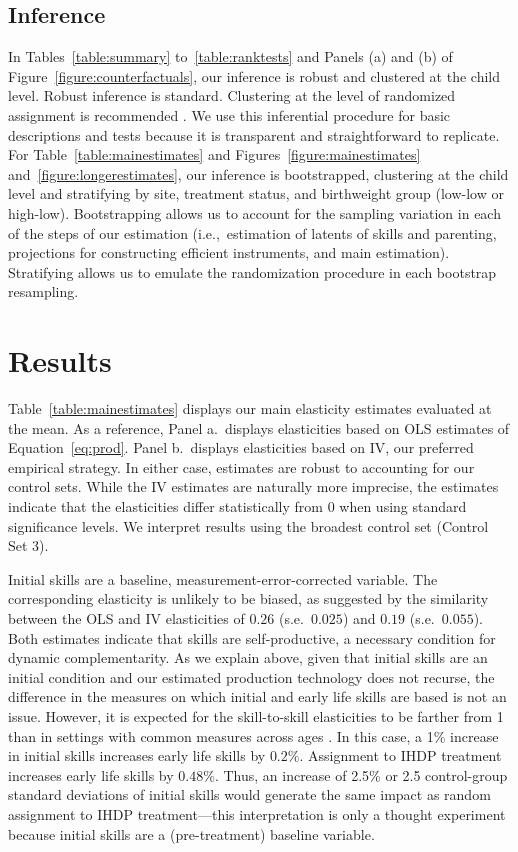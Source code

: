 \subsection{ Inference} In Tables~\ref{table:summary} to~\ref{table:ranktests} and Panels (a) and (b) of Figure~\ref{figure:counterfactuals}, our inference is robust and clustered at the child level. Robust inference is standard. Clustering at the level of randomized assignment is recommended \citep{abadieWhenShouldYou2022}. We use this inferential procedure for basic descriptions and tests because it is transparent and straightforward to replicate. For Table~\ref{table:mainestimates} and Figures~\ref{figure:mainestimates} and~\ref{figure:longerestimates}, our inference is bootstrapped, clustering at the child level and stratifying by site, treatment status, and birthweight group (low-low or high-low). Bootstrapping allows us to account for the sampling variation in each of the steps of our estimation (i.e.,\ estimation of latents of skills and parenting, projections for constructing efficient instruments, and main estimation). Stratifying allows us to emulate the randomization procedure in each bootstrap resampling.

\section{ Results} \label{section:results}

\noindent Table~\ref{table:mainestimates} displays our main elasticity estimates evaluated at the mean. As a reference, Panel a.\ displays elasticities based on OLS estimates of Equation~\eqref{eq:prod}. Panel b.\ displays elasticities based on IV, our preferred empirical strategy. In either case, estimates are robust to accounting for our control sets. While the IV estimates are naturally more imprecise, the estimates indicate that the elasticities differ statistically from 0 when using standard significance levels. We interpret results using the broadest control set (Control Set 3).

Initial skills are a baseline, measurement-error-corrected variable. The corresponding elasticity is unlikely to be biased, as suggested by the similarity between the OLS and IV elasticities of $0.26$ (s.e.\ $0.025$) and $0.19$ (s.e.\ $0.055$). Both estimates indicate that skills are self-productive, a necessary condition for dynamic complementarity. As we explain above, given that initial skills are an initial condition and our estimated production technology does not recurse, the difference in the measures on which initial and early life skills are based is not an issue. However, it is expected for the skill-to-skill elasticities to be farther from 1 than in settings with common measures across ages \citep[e.g.,][]{agostinelliEstimatingTechnologyChildren2016a}. In this case, a 1\% increase in initial skills increases early life skills by $0.2\%$. Assignment to IHDP treatment increases early life skills by $0.48\%$. Thus, an increase of 2.5\% or 2.5 control-group standard deviations of initial skills would generate the same impact as random assignment to IHDP treatment---this interpretation is only a thought experiment because initial skills are a (pre-treatment) baseline variable. 

